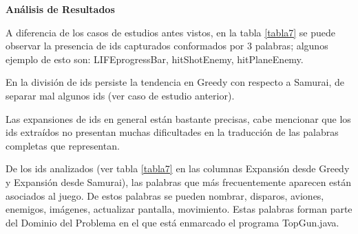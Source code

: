 \noindent \textbf{Análisis de Resultados\\}

A diferencia de los casos de estudios antes vistos, en la tabla \ref{tabla7} se puede observar la presencia de ids capturados conformados por 3 palabras; algunos ejemplo de esto son: \textsf{LIFEprogressBar}, \textsf{hitShotEnemy}, \textsf{hitPlaneEnemy}.

En la división de ids persiste la tendencia en Greedy con respecto a Samurai, de separar mal algunos ids (ver caso de estudio anterior).

Las expansiones de ids en general están bastante precisas, cabe mencionar que los ids extraídos no presentan muchas dificultades en la traducción de las palabras completas que representan.

De los ids analizados (ver tabla \ref{tabla7} en las columnas Expansión desde Greedy y Expansión desde Samurai), las palabras que más frecuentemente aparecen están asociados al juego. De estos palabras se pueden nombrar, disparos, aviones, enemigos, imágenes, actualizar pantalla, movimiento. Estas palabras forman parte del Dominio del Problema en el que está enmarcado el programa TopGun.java.

